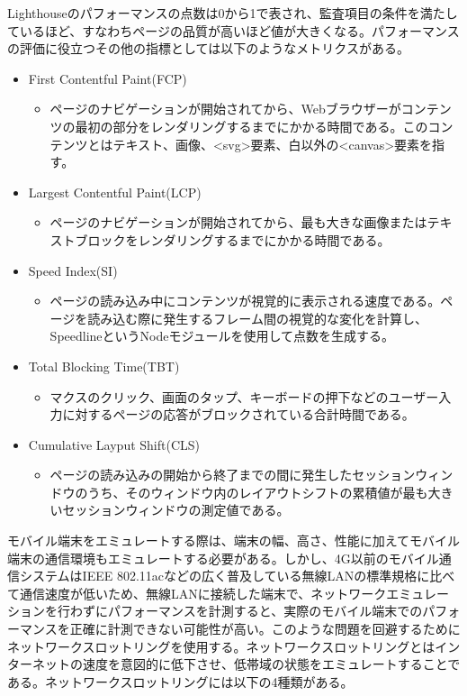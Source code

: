 Lighthouseのパフォーマンスの点数は0から1で表され、監査項目の条件を満たしているほど、すなわちページの品質が高いほど値が大きくなる。パフォーマンスの評価に役立つその他の指標としては以下のようなメトリクスがある。

\begin{itemize}
    \item First Contentful Paint(FCP)
    \begin{itemize}
        \item ページのナビゲーションが開始されてから、Webブラウザーがコンテンツの最初の部分をレンダリングするまでにかかる時間である。このコンテンツとはテキスト、画像、<svg>要素、白以外の<canvas>要素を指す。
    \end{itemize}
    \item Largest Contentful Paint(LCP)
    \begin{itemize}
        \item ページのナビゲーションが開始されてから、最も大きな画像またはテキストブロックをレンダリングするまでにかかる時間である。
    \end{itemize}
    \item Speed Index(SI)
    \begin{itemize}
        \item ページの読み込み中にコンテンツが視覚的に表示される速度である。ページを読み込む際に発生するフレーム間の視覚的な変化を計算し、SpeedlineというNodeモジュールを使用して点数を生成する。
    \end{itemize}
    \item Total Blocking Time(TBT)
    \begin{itemize}
        \item マクスのクリック、画面のタップ、キーボードの押下などのユーザー入力に対するページの応答がブロックされている合計時間である。
    \end{itemize}
    \item Cumulative Layput Shift(CLS)
    \begin{itemize}
        \item ページの読み込みの開始から終了までの間に発生したセッションウィンドウのうち、そのウィンドウ内のレイアウトシフトの累積値が最も大きいセッションウィンドウの測定値である。
    \end{itemize}
\end{itemize}

モバイル端末をエミュレートする際は、端末の幅、高さ、性能に加えてモバイル端末の通信環境もエミュレートする必要がある。しかし、4G以前のモバイル通信システムはIEEE 802.11acなどの広く普及している無線LANの標準規格に比べて通信速度が低いため、無線LANに接続した端末で、ネットワークエミュレーションを行わずにパフォーマンスを計測すると、実際のモバイル端末でのパフォーマンスを正確に計測できない可能性が高い。このような問題を回避するためにネットワークスロットリングを使用する。ネットワークスロットリングとはインターネットの速度を意図的に低下させ、低帯域の状態をエミュレートすることである。ネットワークスロットリングには以下の4種類がある。

